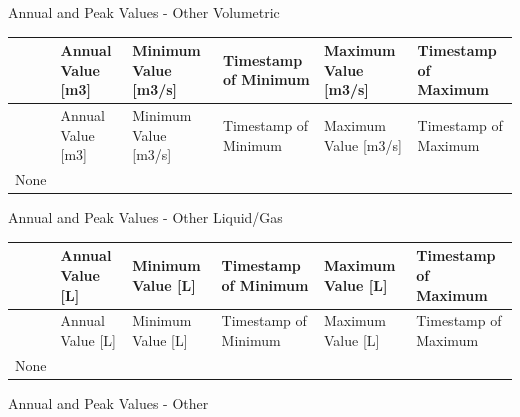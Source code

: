 Annual and Peak Values - Other Volumetric

\begin{longtable}[c]{>{\raggedright}p{1.0in}>{\raggedright}p{1.0in}>{\raggedright}p{1.0in}>{\raggedright}p{1.0in}>{\raggedright}p{1.0in}>{\raggedright}p{1.0in}}
\toprule
 & Annual Value [m3] & Minimum Value [m3/s] & Timestamp of Minimum & Maximum Value [m3/s] & Timestamp of Maximum \tabularnewline
\midrule
\endfirsthead

\toprule
 & Annual Value [m3] & Minimum Value [m3/s] & Timestamp of Minimum & Maximum Value [m3/s] & Timestamp of Maximum \tabularnewline
\midrule
\endhead

None & ~ & ~ & ~ & ~ & ~ \tabularnewline
\bottomrule
\end{longtable}

Annual and Peak Values - Other Liquid/Gas

\begin{longtable}[c]{>{\raggedright}p{1.0in}>{\raggedright}p{1.0in}>{\raggedright}p{1.0in}>{\raggedright}p{1.0in}>{\raggedright}p{1.0in}>{\raggedright}p{1.0in}}
\toprule
 & Annual Value [L] & Minimum Value [L] & Timestamp of Minimum & Maximum Value [L] & Timestamp of Maximum \tabularnewline
\midrule
\endfirsthead

\toprule
 & Annual Value [L] & Minimum Value [L] & Timestamp of Minimum & Maximum Value [L] & Timestamp of Maximum \tabularnewline
\midrule
\endhead

None & ~ & ~ & ~ & ~ & ~ \tabularnewline
\bottomrule
\end{longtable}

Annual and Peak Values - Other

